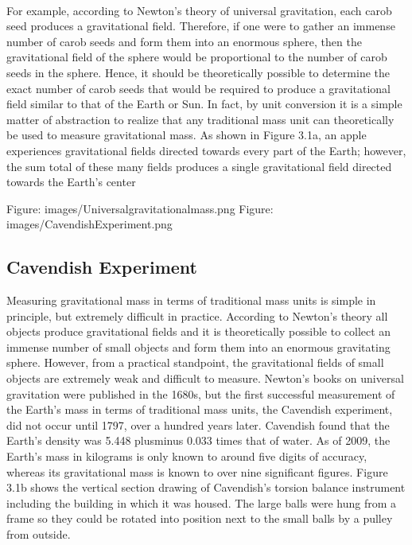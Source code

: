 \documentclass{book}
\begin{document}
    \paragraph{}
    For example, according to Newton's theory of universal gravitation, each carob seed produces a gravitational field. Therefore, if one were to gather an immense number of carob seeds and form them into an enormous sphere, then the gravitational field of the sphere would be proportional to the number of carob seeds in the sphere. Hence, it should be theoretically possible to determine the exact number of carob seeds that would be required to produce a gravitational field similar to that of the Earth or Sun. In fact, by unit conversion it is a simple matter of abstraction to realize that any traditional mass unit can theoretically be used to measure gravitational mass. As shown in Figure 3.1a, an apple experiences gravitational fields directed towards every part of the Earth; however, the sum total of these many fields produces a single gravitational field directed towards the Earth's center
    
    Figure: images/Universalgravitationalmass.png
    Figure: images/CavendishExperiment.png

    \subsection{Cavendish Experiment}
    Measuring gravitational mass in terms of traditional mass units is simple in principle, but extremely difficult in practice. According to Newton's theory all objects produce gravitational fields and it is theoretically possible to collect an immense number of small objects and form them into an enormous gravitating sphere. However, from a practical standpoint, the gravitational fields of small objects are extremely weak and difficult to measure. Newton's books on universal gravitation were published in the 1680s, but the first successful measurement of the Earth's mass in terms of traditional mass units, the Cavendish experiment, did not occur until 1797, over a hundred years later. Cavendish found that the Earth's density was 5.448 plusminus 0.033 times that of water. As of 2009, the Earth's mass in kilograms is only known to around five digits of accuracy, whereas its gravitational mass is known to over nine significant figures.  Figure 3.1b shows the vertical section drawing of Cavendish's torsion balance instrument including the building in which it was housed. The large balls were hung from a frame so they could be rotated into position next to the small balls by a pulley from outside.
    
\end{document}
